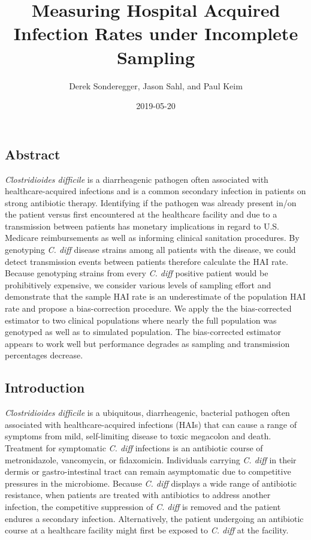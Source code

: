 \documentclass[]{article}
\title{Measuring Hospital Acquired Infection Rates under Incomplete Sampling}
\author{Derek Sonderegger, Jason Sahl, and Paul Keim}
\date{2019-05-20}
\begin{document}
\maketitle

\hypertarget{abstract}{%
\subsection{Abstract}\label{abstract}}

\emph{Clostridioides difficile} is a diarrheagenic pathogen often
associated with healthcare-acquired infections and is a common secondary
infection in patients on strong antibiotic therapy. Identifying if the
pathogen was already present in/on the patient versus first encountered
at the healthcare facility and due to a transmission between patients
has monetary implications in regard to U.S. Medicare reimbursements as
well as informing clinical sanitation procedures. By genotyping \emph{C.
diff} disease strains among all patients with the disease, we could
detect transmission events between patients therefore calculate the HAI
rate. Because genotyping strains from every \emph{C. diff} positive
patient would be prohibitively expensive, we consider various levels of
sampling effort and demonstrate that the sample HAI rate is an
underestimate of the population HAI rate and propose a bias-correction
procedure. We apply the the bias-corrected estimator to two clinical
populations where nearly the full population was genotyped as well as to
simulated population. The bias-corrected estimator appears to work well
but performance degrades as sampling and transmission percentages
decrease.

\hypertarget{introduction}{%
\subsection{Introduction}\label{introduction}}

\emph{Clostridioides difficile} is a ubiquitous, diarrheagenic,
bacterial pathogen often associated with healthcare-acquired infections
(HAIs) that can cause a range of symptoms from mild, self-limiting
disease to toxic megacolon and death. Treatment for symptomatic \emph{C.
diff} infections is an antibiotic course of metronidazole, vancomycin,
or fidaxomicin. Individuals carrying \emph{C. diff} in their dermis or
gastro-intestinal tract can remain asymptomatic due to competitive
pressures in the microbiome. Because \emph{C. diff} displays a wide
range of antibiotic resistance, when patients are treated with
antibiotics to address another infection, the competitive suppression of
\emph{C. diff} is removed and the patient endures a secondary infection.
Alternatively, the patient undergoing an antibiotic course at a
healthcare facility might first be exposed to \emph{C. diff} at the
facility.
\end{document}
